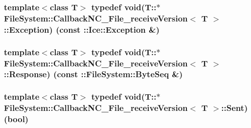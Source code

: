 \subsubsection[{Exception}]{\setlength{\rightskip}{0pt plus 5cm}template$<$class T$>$ typedef void(T\+::$\ast$ {\bf File\+System\+::\+Callback\+N\+C\+\_\+\+File\+\_\+receive\+Version}$<$ T $>$\+::Exception) (const \+::Ice\+::\+Exception \&)}\label{class_file_system_1_1_callback_n_c___file__receive_version_a852c42ee48702dc3f7fe6c0301755500}
\hypertarget{class_file_system_1_1_callback_n_c___file__receive_version_aa60cb3d411660e0c5d1c38f3d2fd6977}{}
\subsubsection[{Response}]{\setlength{\rightskip}{0pt plus 5cm}template$<$class T$>$ typedef void(T\+::$\ast$ {\bf File\+System\+::\+Callback\+N\+C\+\_\+\+File\+\_\+receive\+Version}$<$ T $>$\+::Response) (const \+::{\bf File\+System\+::\+Byte\+Seq} \&)}\label{class_file_system_1_1_callback_n_c___file__receive_version_aa60cb3d411660e0c5d1c38f3d2fd6977}
\hypertarget{class_file_system_1_1_callback_n_c___file__receive_version_ab1b34ba3456b31c2a30649702a73c7a6}{}
\subsubsection[{Sent}]{\setlength{\rightskip}{0pt plus 5cm}template$<$class T$>$ typedef void(T\+::$\ast$ {\bf File\+System\+::\+Callback\+N\+C\+\_\+\+File\+\_\+receive\+Version}$<$ T $>$\+::Sent) (bool)}\label{class_file_system_1_1_callback_n_c___file__receive_version_ab1b34ba3456b31c2a30649702a73c7a6}
\hypertarget{class_file_system_1_1_callback_n_c___file__receive_version_a4bb40a1c1a5f5407c5c42bf0ee950065}{}
